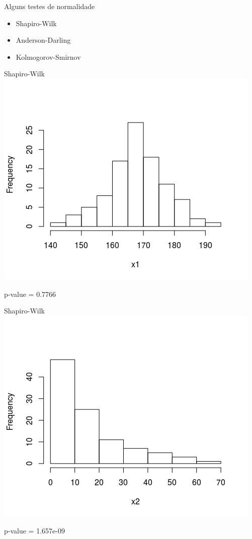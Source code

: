 \documentclass{beamer}
\begin{document}
\begin{frame}{Alguns testes de normalidade}
  \begin{itemize}
  \item<1-> \alert<2>{Shapiro-Wilk}
  \item<1-> Anderson-Darling
  \item<1-> Kolmogorov-Smirnov
  \end{itemize}
\end{frame}

\begin{frame}{Shapiro-Wilk}
  \centering
  \includegraphics[width=.8\textwidth]{Cap37-38/normal1-h}

  p-value = 0.7766
\end{frame}


\begin{frame}{Shapiro-Wilk}
  \centering
  \includegraphics[width=.8\textwidth]{Cap37-38/lognormal1-h}

  p-value = 1.657e-09
\end{frame}
\end{document}
